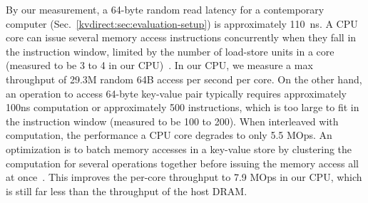 By our measurement, a 64-byte random read latency for a contemporary computer (Sec.~\ref{kvdirect:sec:evaluation-setup}) is approximately 110~ns. A CPU core can issue several memory access instructions concurrently when they fall in the instruction window, limited by the number of load-store units in a core (measured to be 3 to 4 in our CPU)~\cite{gharachorloo1992hiding, han2010packetshader, zhang2015mega}. In our CPU, we measure a max throughput of 29.3M random 64B access per second per core. On the other hand, an operation to access 64-byte key-value pair typically requires approximately 100ns computation or approximately 500 instructions, which is too large to fit in the instruction window (measured to be 100 to 200). When interleaved with computation, the performance a CPU core degrades to only 5.5 MOps. An optimization is to batch memory accesses in a key-value store by clustering the computation for several operations together before issuing the memory access all at once~\cite{li2016full, narula2014phase}. This improves the per-core throughput to 7.9 MOps in our CPU, which is still far less than the throughput of the host DRAM. 


